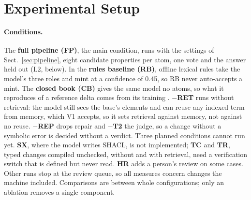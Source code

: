 \section{Experimental Setup}\label{sec:setup}

\paragraph{Conditions.} The \textbf{full pipeline (FP)}, the main condition, runs with the settings of
Sect.~\ref{sec:pipeline}, eight candidate properties per atom, one vote and the answer held out (L2, below). %
In the \textbf{rules baseline (RB)}, offline lexical rules take the model's three roles and mint at a confidence of
0.45, so RB never auto-accepts a mint. %
The \textbf{closed book (CB)} gives the same model no atoms, so what it reproduces of a reference delta comes from
its training \cite{sainz2023contamination,mai2024adapt}. 
\textbf{$-$RET} runs without retrieval: the model still sees the base's elements and can reuse any indexed term from
memory, which V1 accepts, so it sets retrieval against memory, not against no reuse.
\textbf{$-$REP} drops repair and \textbf{$-$T2} the judge, so a change without a symbolic error is decided without
a verdict. %
Three planned conditions cannot run yet. \textbf{SX}, where the model writes \ac{SHACL}, is not implemented;
\textbf{TC} and \textbf{TR}, typed changes compiled unchecked, without and with retrieval, need a verification
switch that is defined but never read. %
\textbf{HR} adds a person's review on some cases. 
Other runs stop at the review queue, so all measures concern changes the machine included. Comparisons are between
whole configurations; only an ablation removes a single component.

